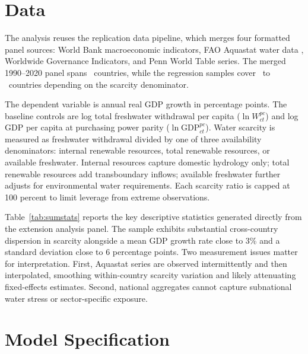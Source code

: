 \documentclass[12pt]{article}
\begin{document}
\section{Data}

The analysis reuses the replication data pipeline, which merges four formatted panel sources: World Bank macroeconomic indicators, FAO Aquastat water data \citep{fao_aquastat}, Worldwide Governance Indicators, and Penn World Table series. The merged 1990--2020 panel spans \MergedCountryCount\ countries, while the regression samples cover \InternalCountryCount\ to \AvailableCountryCount\ countries depending on the scarcity denominator.

The dependent variable is annual real GDP growth in percentage points. The baseline controls are log total freshwater withdrawal per capita ($\ln W^{pc}_{ct}$) and log GDP per capita at purchasing power parity ($\ln \text{GDP}^{pc}_{ct}$). Water scarcity is measured as freshwater withdrawal divided by one of three availability denominators: internal renewable resources, total renewable resources, or available freshwater. Internal resources capture domestic hydrology only; total renewable resources add transboundary inflows; available freshwater further adjusts for environmental water requirements. Each scarcity ratio is capped at 100 percent to limit leverage from extreme observations.

Table~\ref{tab:sumstats} reports the key descriptive statistics generated directly from the extension analysis panel. The sample exhibits substantial cross-country dispersion in scarcity alongside a mean GDP growth rate close to 3\% and a standard deviation close to 6 percentage points. Two measurement issues matter for interpretation. First, Aquastat series are observed intermittently and then interpolated, smoothing within-country scarcity variation and likely attenuating fixed-effects estimates. Second, national aggregates cannot capture subnational water stress or sector-specific exposure.



\clearpage

\section{Model Specification}
\end{document}
